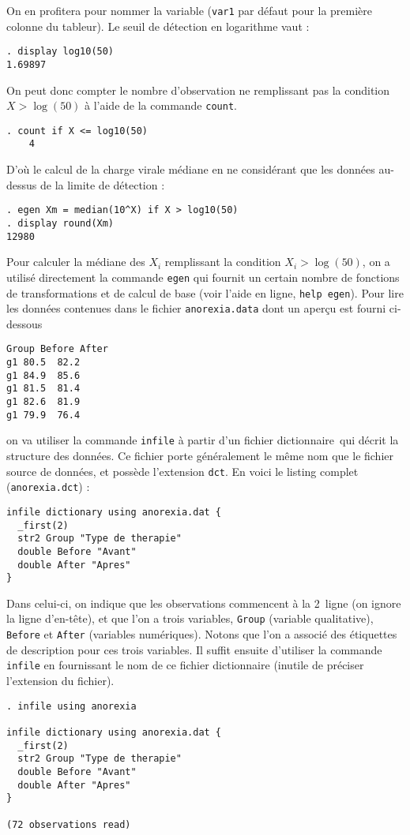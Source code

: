 On en profitera pour nommer la variable (\texttt{var1} par défaut pour la
première colonne du tableur). Le seuil de détection en logarithme vaut :
\begin{verbatim}
. display log10(50)
1.69897
\end{verbatim}
On peut donc compter le nombre d'observation ne remplissant pas la condition
$X>\log(50)$ à l'aide de la commande \texttt{count}.
\begin{verbatim}
. count if X <= log10(50)
    4
\end{verbatim}
D'où le calcul de la charge virale médiane en ne considérant que les données
au-dessus de la limite de détection :
\begin{verbatim}
. egen Xm = median(10^X) if X > log10(50)
. display round(Xm)
12980
\end{verbatim}
Pour calculer la médiane des $X_i$ remplissant la condition $X_i>\log(50)$,
on a utilisé directement la commande \texttt{egen} qui fournit un certain
nombre de fonctions de transformations et de calcul de base (voir l'aide en
ligne, \verb|help egen|).
%
%
%
\soln{\ref{exo:8.3}}
Pour lire les données contenues dans le fichier \texttt{anorexia.data} dont
un aperçu est fourni ci-dessous
\begin{verbatim}
Group Before After
g1 80.5  82.2
g1 84.9  85.6
g1 81.5  81.4
g1 82.6  81.9
g1 79.9  76.4
\end{verbatim}
on va utiliser la commande \texttt{infile} à partir d'un fichier \og
dictionnaire\fg\ qui décrit la structure des données. Ce fichier porte
généralement le même nom que le fichier source de données, et possède
l'extension \texttt{dct}. En voici le listing complet
(\texttt{anorexia.dct}) :
\begin{verbatim}
infile dictionary using anorexia.dat {
  _first(2)
  str2 Group "Type de therapie"
  double Before "Avant"
  double After "Apres"
}
\end{verbatim}
Dans celui-ci, on indique que les observations commencent à la 2\ieme\ ligne
(on ignore la ligne d'en-tête), et que l'on a trois variables,
\texttt{Group} (variable qualitative), \texttt{Before} et \texttt{After}
(variables numériques). Notons que l'on a associé des étiquettes de
description pour ces trois variables. Il suffit ensuite d'utiliser la
commande \texttt{infile} en fournissant le nom de ce fichier dictionnaire
(inutile de préciser l'extension du fichier).
\begin{verbatim}
. infile using anorexia

infile dictionary using anorexia.dat {
  _first(2)
  str2 Group "Type de therapie"
  double Before "Avant"
  double After "Apres"
}

(72 observations read)
\end{verbatim}
